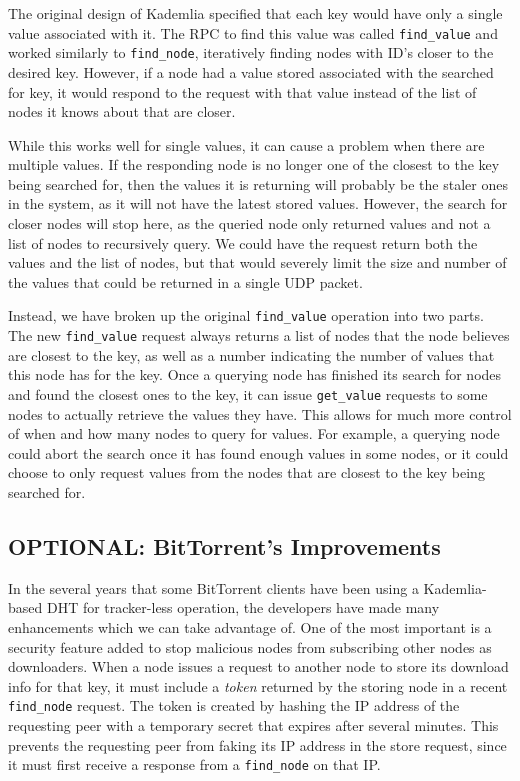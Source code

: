 \documentclass[conference]{IEEEtran}
\begin{document}
The original design of Kademlia specified that each key would have
only a single value associated with it. The RPC to find this value
was called \texttt{find\_value} and worked similarly to
\texttt{find\_node}, iteratively finding nodes with ID's closer to
the desired key. However, if a node had a value stored associated
with the searched for key, it would respond to the request with that
value instead of the list of nodes it knows about that are closer.

While this works well for single values, it can cause a problem when
there are multiple values. If the responding node is no longer one
of the closest to the key being searched for, then the values it is
returning will probably be the staler ones in the system, as it
will not have the latest stored values. However, the search for
closer nodes will stop here, as the queried node only returned
values and not a list of nodes to recursively query. We could have
the request return both the values and the list of nodes, but that
would severely limit the size and number of the values that could be
returned in a single UDP packet.

Instead, we have broken up the original \texttt{find\_value}
operation into two parts. The new \texttt{find\_value} request
always returns a list of nodes that the node believes are closest to
the key, as well as a number indicating the number of values that
this node has for the key. Once a querying node has finished its
search for nodes and found the closest ones to the key, it can issue
\texttt{get\_value} requests to some nodes to actually retrieve the
values they have. This allows for much more control of when and how
many nodes to query for values. For example, a querying node could
abort the search once it has found enough values in some nodes, or
it could choose to only request values from the nodes that are
closest to the key being searched for.

\subsection{\textbf{OPTIONAL}: BitTorrent's Improvements}
\label{bittorrent_dht}

In the several years that some BitTorrent clients have been using a
Kademlia-based DHT for tracker-less operation, the developers have
made many enhancements which we can take advantage of. One of the
most important is a security feature added to stop malicious nodes
from subscribing other nodes as downloaders. When a node issues a
request to another node to store its download info for that key, it
must include a \emph{token} returned by the storing node in a recent
\texttt{find\_node} request. The token is created by hashing the IP
address of the requesting peer with a temporary secret that expires
after several minutes. This prevents the requesting peer from faking
its IP address in the store request, since it must first receive a
response from a \texttt{find\_node} on that IP.
\end{document}
